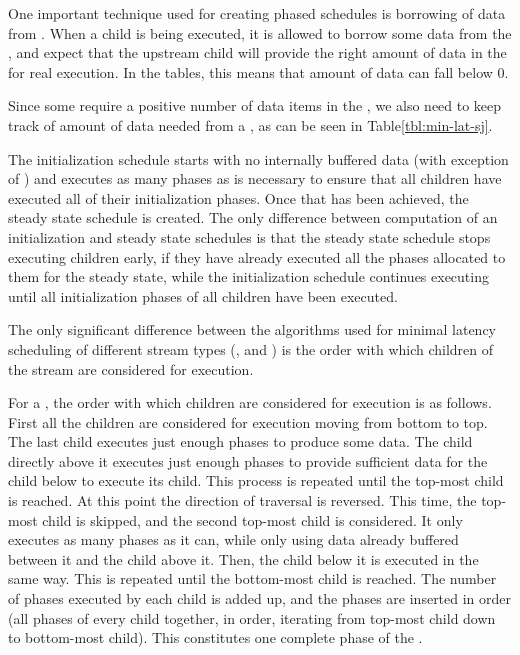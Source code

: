 One important technique used for creating phased schedules is
borrowing of data from {\Channels}.  When a child is being
executed, it is allowed to borrow some data from the {\Channel},
and expect that the upstream child will provide the right amount
of data in the {\Channel} for real execution. In the tables, this
means that amount of data can fall below 0.
\begin{comment}
This is obviously illegal during real execution for any
{\Channel}. Some {\Channels}, however, have even stricter
restrictions. If the node reading from a {\Channel} peeks more
than it pops, the amount of data in the {\Channel} during real
execution cannot fall below the $peek-pop$ amount.
\end{comment}
Since some {\filters} require a positive number of data items in the
{\Channel} , we also need to keep track of amount of data needed
from a {\Channel}, as can be seen in Table\ref{tbl:min-lat-sj}.

The initialization schedule starts with no internally buffered
data (with exception of {{\feedbackloops}}) and executes as many
phases as is necessary to ensure that all children have executed
all of their initialization phases. Once that has been achieved,
the steady state schedule is created. The only difference between
computation of an initialization and steady state schedules is
that the steady state schedule stops executing children early, if
they have already executed all the phases allocated to them for
the steady state, while the initialization schedule continues
executing until all initialization phases of all children have
been executed.

The only significant difference between the algorithms used for
minimal latency scheduling of different stream types ({\pipeline},
{\splitjoin} and {{\feedbackloop}}) is the order with which children
of the stream are considered for execution.

\begin{comment}
For an $i$th child of a stream $s$ (stream $s_n$), the number of
phases that must be executed for its steady state schedule to be
complete is $S_{s,v,i} * |P_{s_i,T}|$.
\end{comment}

For a {\pipeline}, the order with which children are considered for
execution is as follows.  First all the children are considered
for execution moving from bottom to top.  The last child executes
just enough phases to produce some data.  The child directly above
it executes just enough phases to provide sufficient data for the
child below to execute its child.  This process is repeated until
the top-most child is reached.  At this point the direction of
traversal is reversed. This time, the top-most child is skipped,
and the second top-most child is considered.  It only executes as
many phases as it can, while only using data already buffered
between it and the child above it. Then, the child below it is
executed in the same way. This is repeated until the bottom-most
child is reached. The number of phases executed by each child is
added up, and the phases are inserted in order (all phases of
every child together, in order, iterating from top-most child down
to bottom-most child).  This constitutes one complete phase of the
{\pipeline}.

